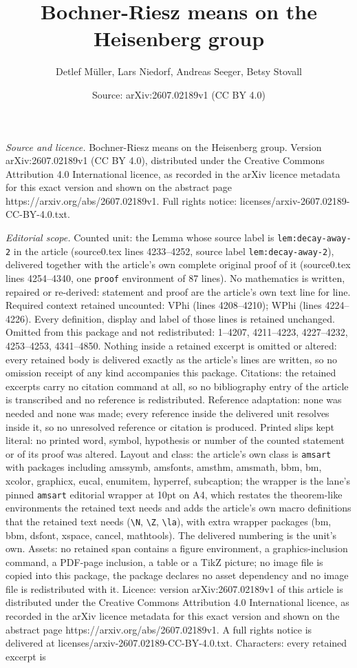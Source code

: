 \documentclass[10pt,a4paper]{amsart}
\title[Bochner-Riesz means on the Heisenberg group]{Bochner-Riesz means on the Heisenberg group}
\author{Detlef M\"uller, Lars Niedorf, Andreas Seeger, Betsy Stovall}
\date{Source: arXiv:2607.02189v1 (CC BY 4.0)}
\begin{document}
\maketitle

\noindent\emph{Source and licence.} Bochner-Riesz means on the Heisenberg group. Version arXiv:2607.02189v1 (CC BY 4.0), distributed under the Creative Commons Attribution 4.0 International licence, as recorded in the arXiv licence metadata for this exact version and shown on the abstract page https://arxiv.org/abs/2607.02189v1. Full rights notice: licenses/arxiv-2607.02189-CC-BY-4.0.txt.\par\smallskip

\noindent\textit{Editorial scope.} Counted unit: the Lemma whose source label is \texttt{lem:decay-away-2} in the article (source0.tex lines 4233--4252, source label \texttt{lem:decay-away-2}), delivered together with the article's own complete original proof of it (source0.tex lines 4254--4340, one \texttt{proof} environment of 87 lines). No mathematics is written, repaired or re-derived: statement and proof are the article's own text line for line. Required context retained uncounted: VPhi (lines 4208--4210); WPhi (lines 4224--4226). Every definition, display and label of those lines is retained unchanged. Omitted from this package and not redistributed: 1--4207, 4211--4223, 4227--4232, 4253--4253, 4341--4850. Nothing inside a retained excerpt is omitted or altered: every retained body is delivered exactly as the article's lines are written, so no omission receipt of any kind accompanies this package. Citations: the retained excerpts carry no citation command at all, so no bibliography entry of the article is transcribed and no reference is redistributed. Reference adaptation: none was needed and none was made; every reference inside the delivered unit resolves inside it, so no unresolved reference or citation is produced. Printed slips kept literal: no printed word, symbol, hypothesis or number of the counted statement or of its proof was altered. Layout and class: the article's own class is \texttt{amsart} with packages including amssymb, amsfonts, amsthm, amsmath, bbm, bm, xcolor, graphicx, eucal, enumitem, hyperref, subcaption; the wrapper is the lane's pinned \texttt{amsart} editorial wrapper at 10pt on A4, which restates the theorem-like environments the retained text needs and adds the article's own macro definitions that the retained text needs (\texttt{\textbackslash N}, \texttt{\textbackslash Z}, \texttt{\textbackslash la}), with extra wrapper packages (bm, bbm, dsfont, xspace, cancel, mathtools). The delivered numbering is the unit's own. Assets: no retained span contains a figure environment, a graphics-inclusion command, a PDF-page inclusion, a table or a TikZ picture; no image file is copied into this package, the package declares no asset dependency and no image file is redistributed with it. Licence: version arXiv:2607.02189v1 of this article is distributed under the Creative Commons Attribution 4.0 International licence, as recorded in the arXiv licence metadata for this exact version and shown on the abstract page https://arxiv.org/abs/2607.02189v1. A full rights notice is delivered at licenses/arxiv-2607.02189-CC-BY-4.0.txt. Characters: every retained excerpt is 
\end{document}
